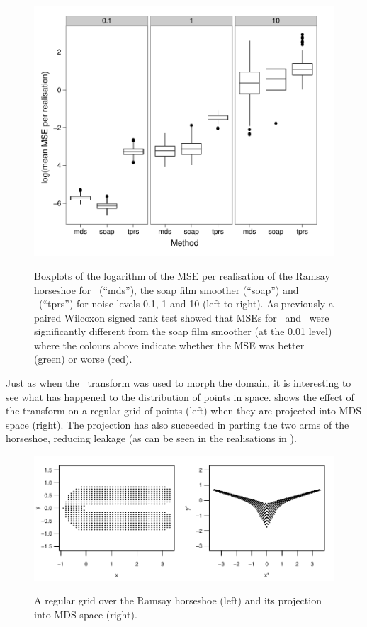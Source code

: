 \begin{figure}
\centering
\includegraphics[width=6in]{mds/figs/mds-ramsay-boxplot.pdf} \\
\caption{Boxplots of the logarithm of the MSE per realisation of the Ramsay horseshoe for \mdsap\ (``mds''), the soap film smoother (``soap'') and \tprs\ (``tprs'') for noise levels 0.1, 1 and 10 (left to right). As previously a paired Wilcoxon signed rank test showed that MSEs for \mdsap\ and \tprs\ were significantly different from the soap film smoother (at the 0.01 level) where the colours above indicate whether the MSE was better (green) or worse (red).}
\label{mds-ramsay-boxplot}
\end{figure}

Just as when the \sch\ transform was used to morph the domain, it is interesting to see what has happened to the distribution of points in space.  shows the effect of the transform on a regular grid of points (left) when they are projected into MDS space (right). The projection has also succeeded in parting the two arms of the horseshoe, reducing leakage (as can be seen in the realisations in ).

\begin{figure}
\centering
\includegraphics[width=6in]{mds/figs/mdsrampoints.pdf} \\
\caption{A regular grid over the Ramsay horseshoe (left) and its projection into MDS space (right).}
\label{mdsrampoints}
\end{figure}


